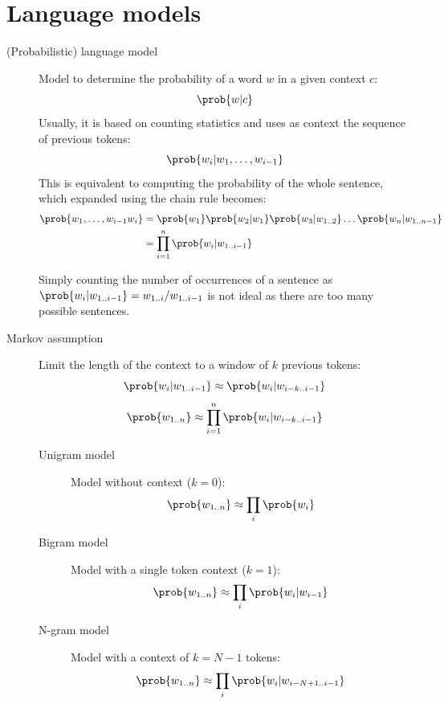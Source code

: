 \section{Language models}

\begin{description}
    \item[(Probabilistic) language model] 
        Model to determine the probability of a word $w$ in a given context $c$:
        \[ \prob{w | c} \]
        Usually, it is based on counting statistics and uses as context the sequence of previous tokens:
        \[ \prob{w_i | w_1, \dots, w_{i-1}} \]
        This is equivalent to computing the probability of the whole sentence, which expanded using the chain rule becomes:
        \[
            \begin{split}
                \prob{w_1, \dots, w_{i-1} w_i} &= \prob{w_1} \prob{w_2 | w_1} \prob{w_3 | w_{1..2}} \dots \prob{w_n | w_{1..n-1}} \\
                &= \prod_{i=1}^{n} \prob{w_i | w_{1..i-1}}
            \end{split}
        \]

        \begin{remark}
            Simply counting the number of occurrences of a sentence as $\prob{w_i | w_{1..i-1}} = w_{1..i} / w_{1..i-1}$ is not ideal as there are too many possible sentences.
        \end{remark}

    \item[Markov assumption] 
        Limit the length of the context to a window of $k$ previous tokens:
        \[ \prob{w_i | w_{1..i-1}} \approx \prob{w_i | w_{i-k..i-1}} \]
        \[ \prob{w_{1..n}} \approx \prod_{i=1}^{n} \prob{w_i | w_{i-k..i-1}} \]

        \begin{description}
            \item[Unigram model]
                Model without context ($k=0$):
                \[ \prob{w_{1..n}} \approx \prod_i \prob{w_i} \]

            \item[Bigram model]
                Model with a single token context ($k=1$):
                \[ \prob{w_{1..n}} \approx \prod_i \prob{w_i | w_{i-1}} \]

            \item[N-gram model] 
                Model with a context of $k=N-1$ tokens:
                \[ \prob{w_{1..n}} \approx \prod_i \prob{w_i | w_{i-N+1..i-1}} \]


\end{description}
\end{description}
